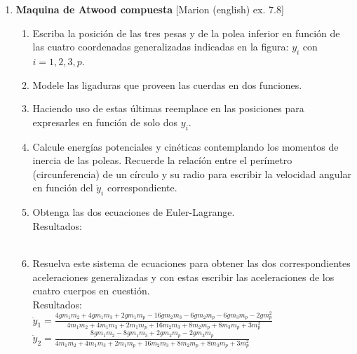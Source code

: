 \documentclass[11pt, spanish, a4paper, twoside]{article}
\begin{document}
\begin{enumerate}
	\item
	\begin{minipage}[t][10cm]{0.65\textwidth}
		\textbf{Maquina de Atwood compuesta} [Marion (english) ex. 7.8]\\ 
		\begin{enumerate}
			\item Escriba la posición de las tres pesas y de la polea inferior en función de 
			las cuatro coordenadas generalizadas indicadas en la figura: \(y_i\) con \(i = 1,2,3,p\). 
			\item Modele las ligaduras que proveen las cuerdas en dos funciones.
			\item Haciendo uso de estas últimas reemplace en las posiciones para expresarles en función de solo dos \(y_i\).
			\item Calcule energías potenciales y cinéticas contemplando los momentos de inercia de las poleas.
			Recuerde la relacíón entre el perímetro (circunferencia) de un círculo y su radio para escribir la velocidad angular en función del \(\dot{y}_i\) correspondiente.
			\item Obtenga las dos ecuaciones de Euler-Lagrange.\\
			Resultados:\\
			\\
			\item Resuelva este sistema de ecuaciones para obtener las dos correspondientes aceleraciones generalizadas y con estas escribir las aceleraciones de los cuatro cuerpos en cuestión.\\
			Resultados:\\
			$\ddot{y}_{1} = \frac{4 g m_{1} m_{2} + 4 g m_{1} m_{3} + 2 g m_{1} m_{p} - 16 g m_{2} m_{3} - 6 g m_{2} m_{p} - 6 g m_{3} m_{p} - 2 g m_{p}^{2}}{4 m_{1} m_{2} + 4 m_{1} m_{3} + 2 m_{1} m_{p} + 16 m_{2} m_{3} + 8 m_{2} m_{p} + 8 m_{3} m_{p} + 3 m_{p}^{2}}$\\
			$\ddot{y}_{2} = \frac{8 g m_{1} m_{2} - 8 g m_{1} m_{3} + 2 g m_{2} m_{p} - 2 g m_{3} m_{p}}{4 m_{1} m_{2} + 4 m_{1} m_{3} + 2 m_{1} m_{p} + 16 m_{2} m_{3} + 8 m_{2} m_{p} + 8 m_{3} m_{p} + 3 m_{p}^{2}}$\\

\end{enumerate}
\end{minipage}
\end{enumerate}
\end{document}
